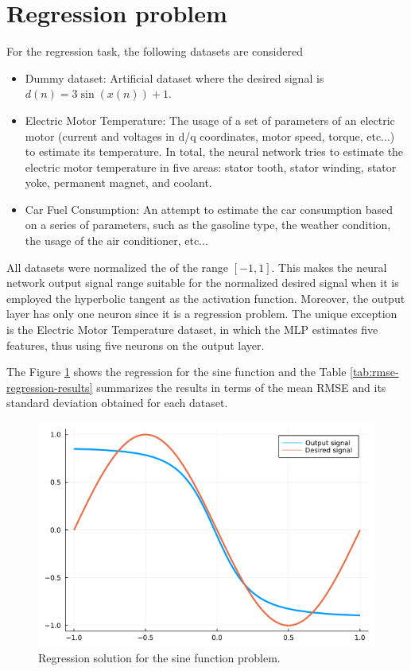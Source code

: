 \documentclass[12pt,a4paper]{article}
\begin{document}
\section*{Regression problem}

For the regression task, the following datasets are considered

\begin{itemize}
    \item Dummy dataset: Artificial dataset where the desired signal is \(d(n) = 3\sin\left( x(n) \right)+1\).
    \item Electric Motor Temperature: The usage of a set of parameters of an electric motor (current and voltages in d/q coordinates, motor speed, torque, etc...) to estimate its temperature. In total, the neural network tries to estimate the electric motor temperature in five areas: stator tooth, stator winding, stator yoke, permanent magnet, and coolant.
    \item Car Fuel Consumption: An attempt to estimate the car consumption based on a series of parameters, such as the gasoline type, the weather condition, the usage of the air conditioner, etc...
\end{itemize}

All datasets were normalized the of the range \([-1, 1]\). This makes the neural network output signal range suitable for the normalized desired signal when it is employed the hyperbolic tangent as the activation function. Moreover, the output layer has only one neuron since it is a regression problem. The unique exception is the Electric Motor Temperature dataset, in which the MLP estimates five features, thus using five neurons on the output layer.

The Figure \ref{fig:sine-regression} shows the regression for the sine function and the Table \ref{tab:rmse-regression-results} summarizes the results in terms of the mean RMSE and its standard deviation obtained for each dataset.

\begin{figure}[H]
    \centering
    \includegraphics[scale=.4]{../trab5 (MLP)/figs/sine_regression.png}
    \caption{Regression solution for the sine function problem.}
    \label{fig:sine-regression}
\end{figure}
\end{document}
